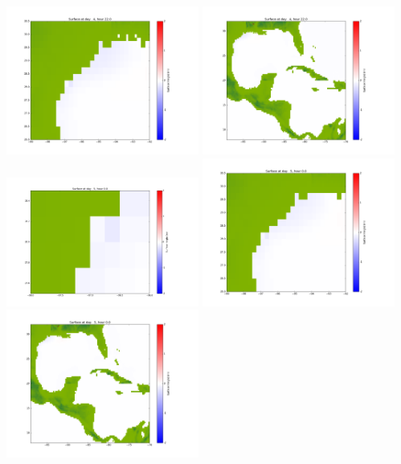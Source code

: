 \documentclass[11pt]{article}
\begin{document}
\includegraphics[width=0.475\textwidth]{frame0083fig1002.png}
\vskip 10pt 
\includegraphics[width=0.475\textwidth]{frame0083fig1003.png}
\vskip 10pt 
\includegraphics[width=0.475\textwidth]{frame0084fig1001.png}
\includegraphics[width=0.475\textwidth]{frame0084fig1002.png}
\vskip 10pt 
\includegraphics[width=0.475\textwidth]{frame0084fig1003.png}
\end{document}
